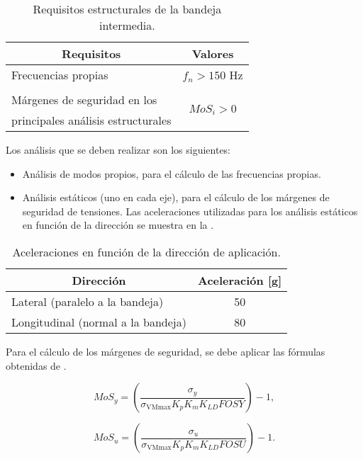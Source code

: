 \begin{table}[H]
\centering
\caption{Requisitos estructurales de la bandeja intermedia.}
\label{tab: requisitos estructurales}
\begin{tabular}{l c}
\toprule
\multicolumn{1}{c}{\textbf{Requisitos}} & \multicolumn{1}{c}{\textbf{Valores}}\\ \midrule
 Frecuencias propias & $f_{n} > 150$ Hz \\ 
 & \\
 Márgenes de seguridad en los & \multirow{2}{*}{$MoS_{i}>0$} \\ 
 principales análisis estructurales & \\\bottomrule
\end{tabular}
\end{table}

Los análisis que se deben realizar son los siguientes:

\begin{itemize}
\item Análisis de modos propios, para el cálculo de las frecuencias propias.
\item Análisis estáticos (uno en cada eje), para el cálculo de los márgenes de seguridad de tensiones. Las aceleraciones utilizadas para los análisis estáticos en función de la dirección se muestra en la .
\end{itemize}

\begin{table}[H]
\centering
\caption{Aceleraciones en función de la dirección de aplicación.}
\label{tab: aceleraciones}      
\begin{tabular}{l c}
\toprule
\multicolumn{1}{c}{\textbf{Dirección}} & \multicolumn{1}{c}{\textbf{Aceleración} [g]}\\ \midrule
 Lateral (paralelo a la bandeja)   & 50   \\
 Longitudinal (normal a la bandeja) & 80 \\ \bottomrule
\end{tabular}
\end{table}

Para el cálculo de los márgenes de seguridad, se debe aplicar las fórmulas obtenidas de \cite{garcia2023manual}.

\begin{equation}
MoS_{y} = \left(\dfrac{\sigma_{y}}{\sigma_{\text{VMmax}} K_{p} K_{m} K_{LD} FOSY}\right)-1,
\end{equation}

\begin{equation}
    MoS_{u} = \left(\dfrac{\sigma_{u}}{\sigma_{\text{VMmax}} K_{p} K_{m} K_{LD} FOSU}\right)-1.
\end{equation}

